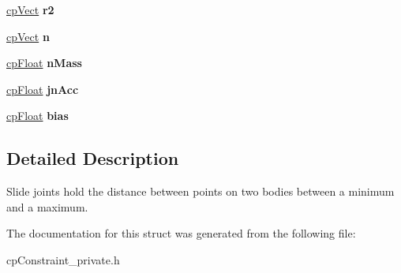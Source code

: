 \begin{DoxyCompactItemize}
\item 
\hypertarget{structcp_slide_joint_a4ba25b2cbb8665e28aa2198df8b53f84}{}\hyperlink{structcp_vect}{cp\+Vect} {\bfseries r2}\label{structcp_slide_joint_a4ba25b2cbb8665e28aa2198df8b53f84}

\item 
\hypertarget{structcp_slide_joint_a984ebef2e99ef0e1e4bdb2d0b7aa3d50}{}\hyperlink{structcp_vect}{cp\+Vect} {\bfseries n}\label{structcp_slide_joint_a984ebef2e99ef0e1e4bdb2d0b7aa3d50}

\item 
\hypertarget{structcp_slide_joint_afc1d5423a8637a8b101e713d91b218e3}{}\hyperlink{group__basic_types_gac1ed65573e035bf892505768c852d8d3}{cp\+Float} {\bfseries n\+Mass}\label{structcp_slide_joint_afc1d5423a8637a8b101e713d91b218e3}

\item 
\hypertarget{structcp_slide_joint_a2722beb353431b561c8fa9431750cc4e}{}\hyperlink{group__basic_types_gac1ed65573e035bf892505768c852d8d3}{cp\+Float} {\bfseries jn\+Acc}\label{structcp_slide_joint_a2722beb353431b561c8fa9431750cc4e}

\item 
\hypertarget{structcp_slide_joint_a799773608a020dcd87eb6b00d7058a00}{}\hyperlink{group__basic_types_gac1ed65573e035bf892505768c852d8d3}{cp\+Float} {\bfseries bias}\label{structcp_slide_joint_a799773608a020dcd87eb6b00d7058a00}

\end{DoxyCompactItemize}


\subsection{Detailed Description}
Slide joints hold the distance between points on two bodies between a minimum and a maximum. 

The documentation for this struct was generated from the following file\+:\begin{DoxyCompactItemize}
\item 
cp\+Constraint\+\_\+private.\+h\end{DoxyCompactItemize}
